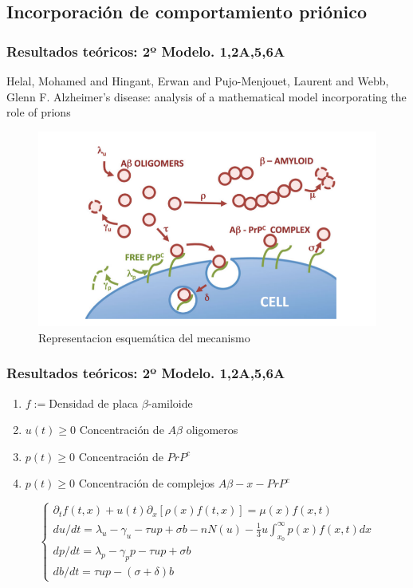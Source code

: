 \documentclass{beamer}
\begin{document}
\subsection{Incorporación de comportamiento priónico}
\begin{frame}
	\frametitle{Resultados teóricos: 2º Modelo. 1,2A,5,6A}
	\begin{block}{Helal, Mohamed and Hingant, Erwan and Pujo-Menjouet, Laurent and Webb, Glenn F.}
		Alzheimer’s disease: analysis of a mathematical model incorporating the role of prions
	\end{block}
	\begin{figure}[Esquema]
		\includegraphics[scale=0.3]{segunda1.png}
		\caption{Representacion esquemática del mecanismo}
		\label{cerebro5}
	\end{figure}
\end{frame}

\begin{frame}
	\frametitle{Resultados teóricos: 2º Modelo. 1,2A,5,6A}
	
	\begin{enumerate}
		\item $f:=$Densidad de placa $\beta$-amiloide 
		\item $u(t)\geq0$ Concentración de $A\beta$ oligomeros
		\item $p(t)\geq0$ Concentración de $PrP^c$
		\item $p(t)\geq0$ Concentración de complejos $A\beta-x-PrP^c$ 
	\end{enumerate}
	\begin{equation}
	\left\lbrace
	\begin{array}{ll}
	\partial_tf(t,x)+u(t)\partial_x[\rho(x)f(t,x)]=\mu(x)f(x,t) \\
	du/dt=\lambda_u-\gamma_u-\tau u p+\sigma b-nN(u)-\frac{1}{3}u\int_{x_0}^{\infty}p(x)f(x,t)dx\\
	dp/dt=\lambda_p-\gamma_pp-\tau u p+\sigma b  \\
	db/dt=\tau u p-(\sigma+\delta)b
	\end{array}
	\right.
	\end{equation}
	
\end{frame}
\end{document}
